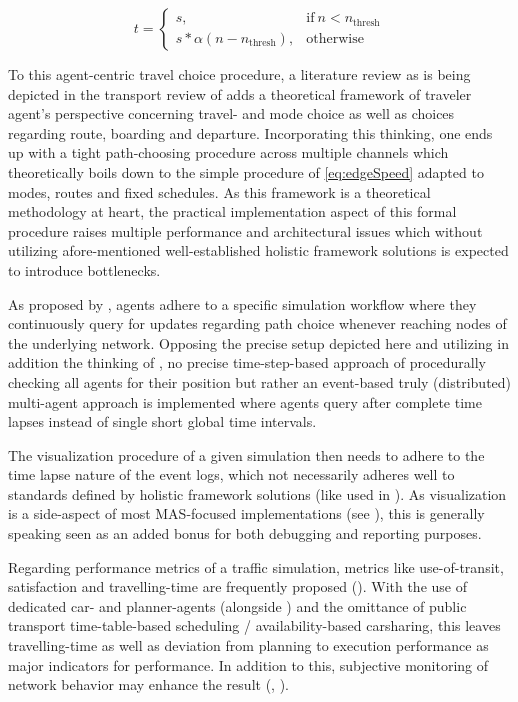\begin{equation}\label{eq:edgeSpeed}
    t = 
    \begin{cases}
        s, & \text{if}\ n < n_{\text{thresh}} \\
        s * \alpha(n - n_{\text{thresh}}), & \text{otherwise}
    \end{cases}
\end{equation}

To this agent-centric travel choice procedure, a literature review as is being depicted in the transport review of \cite{brakewood2018literature} adds a theoretical framework of traveler agent's perspective concerning travel- and mode choice as well as choices regarding route, boarding and departure. Incorporating this thinking, one ends up with a tight path-choosing procedure across multiple channels which theoretically boils down to the simple procedure of \autoref{eq:edgeSpeed} adapted to modes, routes and fixed schedules.
As this framework is a theoretical methodology at heart, the practical implementation aspect of this formal procedure raises multiple performance and architectural issues which without utilizing afore-mentioned well-established holistic framework solutions is expected to introduce bottlenecks.

As proposed by \cite{zargayouna2013agent}, agents adhere to a specific simulation workflow where they continuously query for updates regarding path choice whenever reaching nodes of the underlying network. Opposing the precise setup depicted here and utilizing in addition the thinking of \cite{mastio2015towards}, no precise time-step-based approach of procedurally checking all agents for their position but rather an event-based truly (distributed) multi-agent approach is implemented where agents query after complete time lapses instead of single short global time intervals. 

The visualization procedure of a given simulation then needs to adhere to the time lapse nature of the event logs, which not necessarily adheres well to standards defined by holistic framework solutions (like used in \cite{zargayouna2013agent}\cite{ksontini2016building}). As visualization is a side-aspect of most MAS-focused implementations (see \cite{mastio2015towards}), this is generally speaking seen as an added bonus for both debugging and reporting purposes.

Regarding performance metrics of a traffic simulation, metrics like use-of-transit, satisfaction and travelling-time are frequently proposed (\cite{brakewood2018literature}). With the use of dedicated car- and planner-agents (alongside \cite{zargayouna2013agent}) and the omittance of public transport time-table-based scheduling / availability-based carsharing, this leaves travelling-time as well as deviation from planning to execution performance as major indicators for performance.
In addition to this, subjective monitoring of network behavior may enhance the result (\cite{brakewood2018literature}, \cite{zargayouna2013agent}).
